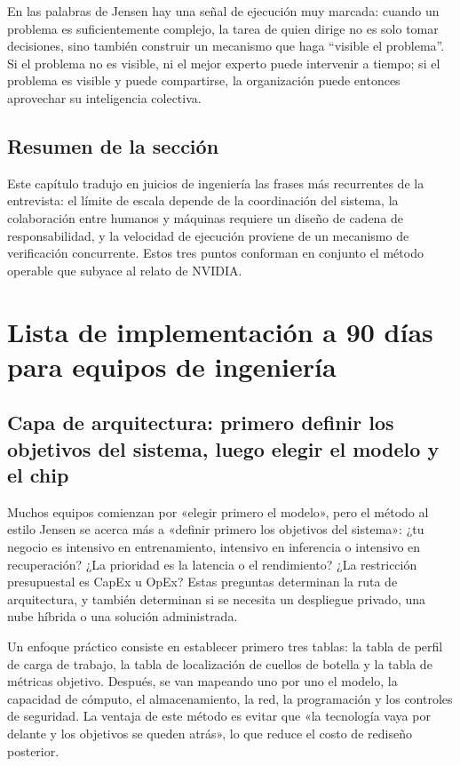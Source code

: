 \documentclass[a4paper]{article}
\begin{document}
En las palabras de Jensen hay una señal de ejecución muy marcada: cuando un problema es suficientemente complejo, la tarea de quien dirige no es solo tomar decisiones, sino también construir un mecanismo que haga ``visible el problema''. Si el problema no es visible, ni el mejor experto puede intervenir a tiempo; si el problema es visible y puede compartirse, la organización puede entonces aprovechar su inteligencia colectiva.

\subsection{Resumen de la sección}

Este capítulo tradujo en juicios de ingeniería las frases más recurrentes de la entrevista: el límite de escala depende de la coordinación del sistema, la colaboración entre humanos y máquinas requiere un diseño de cadena de responsabilidad, y la velocidad de ejecución proviene de un mecanismo de verificación concurrente. Estos tres puntos conforman en conjunto el método operable que subyace al relato de NVIDIA.

\section{Lista de implementación a 90 días para equipos de ingeniería}

\subsection{Capa de arquitectura: primero definir los objetivos del sistema, luego elegir el modelo y el chip}

Muchos equipos comienzan por «elegir primero el modelo», pero el método al estilo Jensen se acerca más a «definir primero los objetivos del sistema»: ¿tu negocio es intensivo en entrenamiento, intensivo en inferencia o intensivo en recuperación? ¿La prioridad es la latencia o el rendimiento? ¿La restricción presupuestal es CapEx u OpEx? Estas preguntas determinan la ruta de arquitectura, y también determinan si se necesita un despliegue privado, una nube híbrida o una solución administrada.

Un enfoque práctico consiste en establecer primero tres tablas: la tabla de perfil de carga de trabajo, la tabla de localización de cuellos de botella y la tabla de métricas objetivo. Después, se van mapeando uno por uno el modelo, la capacidad de cómputo, el almacenamiento, la red, la programación y los controles de seguridad. La ventaja de este método es evitar que «la tecnología vaya por delante y los objetivos se queden atrás», lo que reduce el costo de rediseño posterior.
\end{document}
